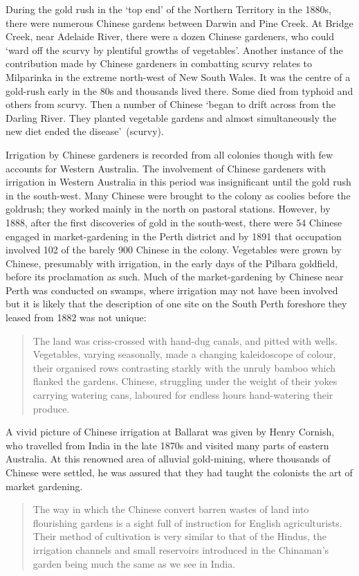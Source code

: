 During the gold rush in the `top end' of the Northern Territory in the
1880s, there were numerous Chinese gardens between Darwin and Pine
Creek.  At Bridge Creek, near Adelaide River, there were a dozen
Chinese gardeners, who could `ward off the scurvy by plentiful growths
of vegetables'.  Another instance of the contribution made by Chinese
gardeners in combatting scurvy relates to Milparinka in the extreme
north-west of New South Wales.  It was the centre of a gold-rush early
in the 80s and thousands lived there.  Some died from typhoid and
others from scurvy.  Then a number of Chinese `began to drift across
from the Darling River. They planted vegetable gardens and almost
simultaneously the new diet ended the
disease'~(scurvy).

Irrigation by Chinese gardeners is recorded from all colonies though
with few accounts for Western Australia.  The involvement of Chinese
gardeners with irrigation in Western Australia in this period was
insignificant until the gold rush in the south-west.  Many Chinese
were brought to the colony as coolies before the goldrush; they worked
mainly in the north on pastoral stations.  However, by 1888, after the
first discoveries of gold in the south-west, there were 54 Chinese
engaged in market-gardening in the Perth district and by 1891 that
occupation involved 102 of the barely 900 Chinese in the colony.
Vegetables were grown by Chinese, presumably with irrigation, in the
early days of the Pilbara goldfield, before its proclamation as
such.  Much of the market-gardening
by Chinese near Perth was conducted on swamps, where irrigation may
not have been involved but it is likely that the description of one
site on the South Perth foreshore they leased from 1882 was not
unique:
\begin{quote}
	The land was criss-crossed with hand-dug canals, and pitted
	with wells.  Vegetables, varying seasonally, made a changing
	kaleidoscope of colour, their organised rows contrasting
	starkly with the unruly bamboo which flanked the gardens.
	Chinese, struggling under the weight of their yokes carrying
	watering cans, laboured for endless hours hand-watering their
	produce.
\end{quote}

A vivid picture of Chinese irrigation at Ballarat was given by Henry
Cornish, who travelled from India in the late 1870s and visited many
parts of eastern Australia. At this renowned area of alluvial
gold-mining, where thousands of Chinese were settled, he was assured
that they had taught the colonists the art of market gardening.
\begin{quote}
	The way in which the Chinese convert barren wastes of land
	into flourishing gardens is a sight full of instruction for
	English agriculturists. Their method of cultivation is very
	similar to that of the Hindus, the irrigation channels and
	small reservoirs introduced in the Chinaman's garden being
	much the same as we see in India.
\end{quote}

